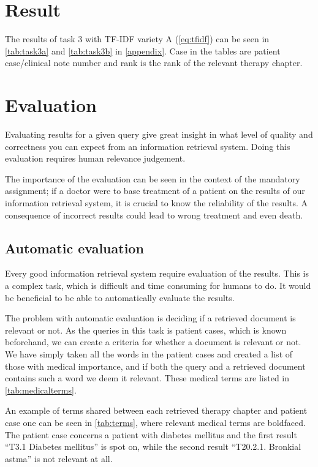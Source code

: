 \documentclass[a4paper, 11pt]{article}
\begin{document}
\section{Result}
\label{sec:result}
The results of task 3 with TF-IDF variety A (\autoref{eq:tfidf}) can be seen in
\autoref{tab:task3a} and \autoref{tab:task3b} in \autoref{appendix}.
Case in the tables are patient case/clinical note number and rank is the rank
of the relevant therapy chapter.


\section{Evaluation}
\label{sec:evaluation}
Evaluating results for a given query give great insight in what level of quality and correctness you can expect from an information retrieval system. Doing this evaluation requires human relevance judgement.

The importance of the evaluation can be seen in the context of the mandatory assignment; if a doctor were to base treatment of a patient on the results of our information retrieval system, it is crucial to know the reliability of the results. A consequence of incorrect results could lead to wrong treatment and even death.

\subsection{Automatic evaluation}
Every good information retrieval system require evaluation of the results. This is a complex task, which is difficult and time consuming for humans to do. It would be beneficial to be able to automatically evaluate the results.

The problem with automatic evaluation is deciding if a retrieved document
is relevant or not. As the queries in this task is patient cases, which is
known beforehand, we can create a criteria for whether a document is relevant
or not. We have simply taken all the words in the patient cases and created a
list of those with medical importance, and if both the query and a retrieved
document contains such a word we deem it relevant. These medical terms are
listed in \autoref{tab:medicalterms}.

An example of terms shared between each retrieved therapy
chapter and patient case one can be seen in \autoref{tab:terms}, where
relevant medical terms are boldfaced. The patient case concerns a patient with
diabetes mellitus and the first result ``T3.1 Diabetes mellitus'' is spot on,
while the second result ``T20.2.1. Bronkial astma'' is not relevant at all.
\end{document}
